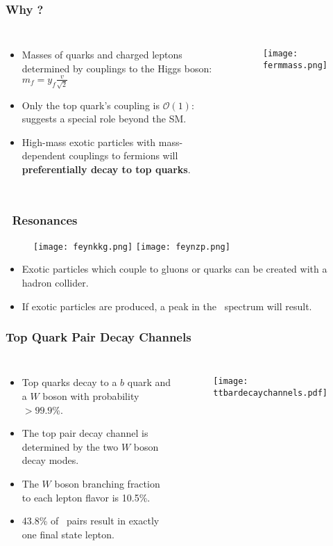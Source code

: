\begin{frame}
    \frametitle{Why ?}
\begin{columns}
\begin{itemize}
    \item Masses of quarks and charged leptons determined by
        couplings to the Higgs boson: $m_f = y_f \frac{v}{\sqrt 2}$
    \item Only the top quark's coupling is $\mathcal{O}(1)$: suggests
        a special role beyond the SM\@.
    \item High-mass exotic particles with mass-dependent couplings to
        fermions will {\bf preferentially decay to top quarks}.
\end{itemize}
\begin{figure}
\centering
\texttt{[image: fermmass.png]} %
\end{figure}
\end{columns}
\end{frame}

\begin{frame}
    \frametitle{\ttbar\ Resonances}
\centering
\begin{figure}
\texttt{[image: feynkkg.png]}
\texttt{[image: feynzp.png]}
\end{figure}
\begin{itemize}
\item Exotic particles which couple to gluons or quarks can be created
    with a hadron collider.
\item If exotic particles are produced, a peak in the \mtt\ spectrum
    will result.
\end{itemize}
\end{frame}

\begin{frame}
\frametitle{Top Quark Pair Decay Channels}
\begin{columns}
\begin{itemize}
    \item Top quarks decay to a $b$ quark and a $W$ boson with
        probability $> 99.9$\%.
    \item The top pair decay channel is
        determined by the two $W$ boson decay modes.
    \item The $W$ boson branching fraction to each lepton flavor is
        10.5\%.
    \item 43.8\% of \ttbar\ pairs result in exactly one final state lepton.
\end{itemize}

\begin{figure}
\centering
\texttt{[image: ttbardecaychannels.pdf]}
\end{figure}
\end{columns}
\end{frame}

